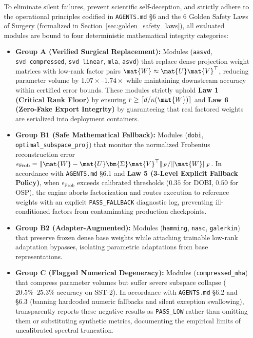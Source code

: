 To eliminate silent failures, prevent scientific self-deception, and strictly adhere to the operational principles codified in \texttt{AGENTS.md} \S6 and the 6 Golden Safety Laws of Surgery (formalized in Section~\ref{sec:golden_safety_laws}), all evaluated modules are bound to four deterministic mathematical integrity categories:
\begin{itemize}
    \item \textbf{Group A (Verified Surgical Replacement):} Modules (\texttt{aasvd}, \texttt{svd\_compressed}, \texttt{svd\_linear}, \texttt{mla}, \texttt{asvd}) that replace dense projection weight matrices with low-rank factor pairs $\mat{W} \approx \mat{U}\mat{V}^\top$, reducing parameter volume by $1.07\times\text{--}1.74\times$ while maintaining downstream accuracy within certified error bounds. These modules strictly uphold \textbf{Law 1 (Critical Rank Floor)} by ensuring $r \ge \lceil d / \kappa(\mat{W}) \rceil$ and \textbf{Law 6 (Zero-Fake Export Integrity)} by guaranteeing that real factored weights are serialized into deployment containers.
    \item \textbf{Group B1 (Safe Mathematical Fallback):} Modules (\texttt{dobi}, \texttt{optimal\_subspace\_proj}) that monitor the normalized Frobenius reconstruction error $\epsilon_{\text{Frob}} = \|\mat{W} - \mat{U}\bm{\Sigma}\mat{V}^\top\|_F / \|\mat{W}\|_F$. In accordance with \texttt{AGENTS.md} \S6.1 and \textbf{Law 5 (3-Level Explicit Fallback Policy)}, when $\epsilon_{\text{Frob}}$ exceeds calibrated thresholds ($0.35$ for DOBI, $0.50$ for OSP), the engine aborts factorization and routes execution to reference weights with an explicit \texttt{PASS\_FALLBACK} diagnostic log, preventing ill-conditioned factors from contaminating production checkpoints.
    \item \textbf{Group B2 (Adapter-Augmented):} Modules (\texttt{hamming}, \texttt{nasc}, \texttt{galerkin}) that preserve frozen dense base weights while attaching trainable low-rank adaptation bypasses, isolating parametric adaptations from base representations.
    \item \textbf{Group C (Flagged Numerical Degeneracy):} Modules (\texttt{compressed\_mha}) that compress parameter volumes but suffer severe subspace collapse ($20.5\%\text{--}25.3\%$ accuracy on SST-2). In accordance with \texttt{AGENTS.md} \S6.2 and \S6.3 (banning hardcoded numeric fallbacks and silent exception swallowing), \neuralops{} transparently reports these negative results as \texttt{PASS\_LOW} rather than omitting them or substituting synthetic metrics, documenting the empirical limits of uncalibrated spectral truncation.
\end{itemize}

